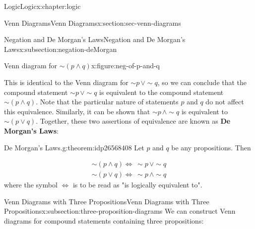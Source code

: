 \documentclass[twoside,10pt,]{book}
\newcommand{\terminology}[1]{\textbf{#1}}
\numberwithin{equation}{section}
\begin{document}
\begin{chapterptx}{Logic}{}{Logic}{}{}{x:chapter:logic}
\begin{sectionptx}{Venn Diagrams}{}{Venn Diagrams}{}{}{x:section:sec-venn-diagrams}
\begin{subsectionptx}{Negation and De Morgan's Laws}{}{Negation and De Morgan's Laws}{}{}{x:subsection:negation-deMorgan}
\par
\begin{figureptx}{Venn diagram for \(\sim\!(p {\wedge} q)\)}{x:figure:neg-of-p-and-q}{}%
\begin{image}{0.3}{0.4}{0.3}%
\resizebox{\linewidth}{!}{%
\begin{venndiagram2sets}[labelA={$p$},labelB={$q$}]
  \fillNotAorNotB
\end{venndiagram2sets}
}%
\end{image}%
\tcblower
\end{figureptx}%
%
\par
This is identical to the Venn diagram for \(\sim\!{p}\,{\vee} \sim\!{q}\), so we can conclude that the compound statement \(\sim\!{p}\,{\vee} \sim\!{q}\) is equivalent to the compound statement \(\sim\!(p {\wedge} q)\).  Note that the particular nature of statements \(p\) and \(q\) do not affect this equivalence.  Similarly, it can be shown that \(\sim\!{p}\,{\wedge}\sim\!{q}\) is equivalent to \(\sim\!(p{\vee} q)\).  Together, these two assertions of equivalence are known as \terminology{De Morgan's Laws}: \begin{theorem}{De Morgan's Laws.}{}{g:theorem:idp26568408}%
Let \(p\) and \(q\) be any propositions.  Then%
\par
%
\begin{gather*}
\sim\!(p{\wedge} q)\Leftrightarrow\,\sim\!{p}\,{\vee}\sim\!{q}\\
\sim\!(p{\vee} q)\Leftrightarrow\,\sim\!{p}\,{\wedge}\sim\!{q}
\end{gather*}
where the symbol \(\Leftrightarrow\) is to be read as "is logically equivalent to".%
\end{theorem}
%
\end{subsectionptx}
%
%
\typeout{************************************************}
\typeout{************************************************}
%
\begin{subsectionptx}{Venn Diagrams with Three Propositions}{}{Venn Diagrams with Three Propositions}{}{}{x:subsection:three-proposition-diagrams}
We can construct Venn diagrams for compound statements containing three propositions:%
\par
\begin{image}{0.3}{0.4}{0.3}%
\resizebox{\linewidth}{!}{%
\begin{venndiagram3sets}[labelA={$p$},labelB={$q$},labelC={$r$}]
\end{venndiagram3sets}
}%
\end{image}%

\end{subsectionptx}
\end{sectionptx}
\end{chapterptx}
\end{document}

